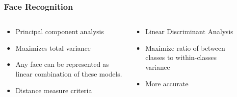 \documentclass[aspectratio=149]{beamer}
\begin{document}

\begin{frame}
\frametitle{Face Recognition}
\begin{columns}
	\begin{column}{.35\textwidth}
		\begin{itemize}
			\item Principal component analysis
			\item Maximizes total variance
			\item Any face can be represented as linear combination of these models.
			\item Distance measure criteria
		\end{itemize}
	\end{column}
	\begin{column}{.35\textwidth}
		\begin{itemize}
			\item Linear Discriminant Analysis 
			\item Maximize ratio of between-classes to within-classes variance
			\item More accurate
		\end{itemize}
	\end{column}
	\begin{column}{.35\textwidth}
		
	\end{column}
\end{columns} 

\end{frame}

\end{document}
